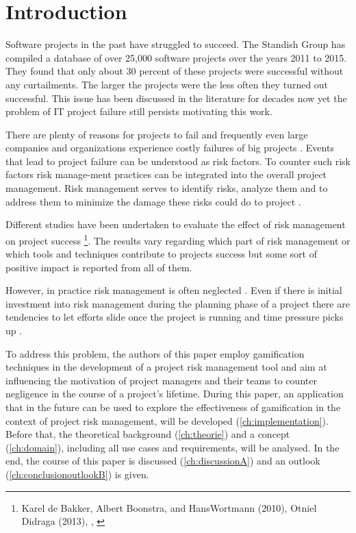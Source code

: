 \chapter{Introduction}
\label{ch:introduction}

Software projects in the past have struggled to succeed. The Standish Group \cite{thestandishgroupinternationalincChaosReport20152015} has compiled a database of over 25,000 software projects over the years 2011 to 2015. They found that only about 30 percent of these projects were successful without any curtailments. The larger the projects were the less often they turned out successful. This issue has been discussed in the literature for decades now yet the problem of IT project failure still persists motivating this work.

There are plenty of reasons for projects to fail and frequently even large companies and organizations experience costly failures of big projects \cite{dwivediResearchInformationSystems2015}. Events that lead to project failure can be understood as risk factors. To counter such risk factors risk manage-ment practices can be integrated into the overall project management. Risk management serves to identify risks, analyze them and to address them to minimize the damage these risks could do to project \cite{teschITProjectRisk2007}.

Different studies have been undertaken to evaluate the effect of risk management on project success \footnote{Karel de Bakker, Albert Boonstra, and HansWortmann (2010), Otniel Didraga (2013), \cite{kwakProjectRiskManagement2004}, \cite{peixotoProjectRiskManagement2014}}. The results vary regarding which part of risk management or which tools and techniques contribute to projects success but some sort of positive impact is reported from all of them.

However, in practice risk management is often neglected \cite{kwakProjectRiskManagement2004}. Even if there is initial investment into risk management during the planning phase of a project there are tendencies to let efforts slide once the project is running and time pressure picks up \cite{peixotoProjectRiskManagement2014}.

To address this problem, the authors of this paper employ gamification techniques in the development of a project risk management tool and aim at influencing the motivation of project managers and their teams to counter negligence in the course of a project’s lifetime. During this paper, an application that in the future can be used to explore the effectiveness of gamification in the context of project risk management, will be developed (\ref{ch:implementation}). Before that, the theoretical background (\ref{ch:theorie}) and a concept (\ref{ch:domain}), including all use cases and requirements, will be analysed. In the end, the course of this paper is discussed (\ref{ch:discussionA}) and an outlook (\ref{ch:conclusionoutlookB}) is given.

